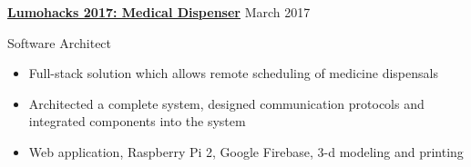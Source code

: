 	\hspace{1cm}

	\noindent
	\begin{large}
		\textbf{\href{https://lumohacks-med-disp.github.io/}{Lumohacks 2017: Medical Dispenser}} \hfill March 2017 \\
	\end{large}
	Software Architect
	\begin{itemize}
		\item Full-stack solution which allows remote scheduling of medicine dispensals
		\item Architected a complete system, designed communication protocols and integrated components into the system
		\item Web application, Raspberry Pi 2, Google Firebase, 3-d modeling and printing
	\end{itemize}
